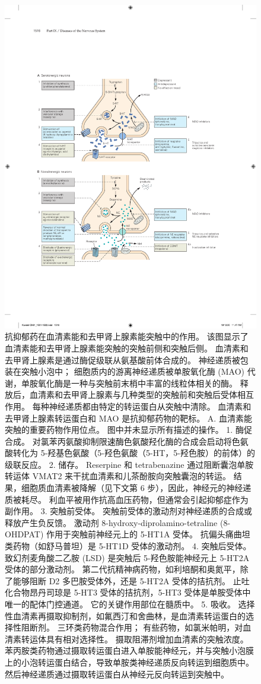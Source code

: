 \begin{figure}[htbp]
	\centering
	\includegraphics[width=0.9\linewidth]{chap61/fig_61_7}
	\caption{抗抑郁药在血清素能和去甲肾上腺素能突触中的作用。 该图显示了血清素能和去甲肾上腺素能突触的突触前侧和突触后侧。 血清素和去甲肾上腺素是通过酶促级联从氨基酸前体合成的。 神经递质被包装在突触小泡中； 细胞质内的游离神经递质被单胺氧化酶 (MAO) 代谢，单胺氧化酶是一种与突触前末梢中丰富的线粒体相关的酶。 释放后，血清素和去甲肾上腺素与几种类型的突触前和突触后受体相互作用。 每种神经递质都由特定的转运蛋白从突触中清除。 血清素和去甲肾上腺素转运蛋白和 MAO 是抗抑郁药物的靶标。 A. 血清素能突触的重要药物作用位点。 图中并未显示所有描述的操作。 1. 酶促合成。 对氯苯丙氨酸抑制限速酶色氨酸羟化酶的合成会启动将色氨酸转化为 5-羟基色氨酸（5-羟色氨酸（5-HT，5-羟色胺）的前体）的级联反应。 2. 储存。 Reserpine 和 tetrabenazine 通过阻断囊泡单胺转运体 VMAT2 来干扰血清素和儿茶酚胺向突触囊泡的转运。 结果，细胞质血清素被降解（见下文第 6 步），因此，神经元的神经递质被耗尽。 利血平被用作抗高血压药物，但通常会引起抑郁症作为副作用。 3. 突触前受体。 突触前受体的激动剂对神经递质的合成或释放产生负反馈。 激动剂 8-hydroxy-diprolamino-tetraline (8-OHDPAT) 作用于突触前神经元上的 5-HT1A 受体。 抗偏头痛曲坦类药物（如舒马普坦）是 5-HT1D 受体的激动剂。 4. 突触后受体。 致幻剂麦角酸二乙胺 (LSD) 是突触后 5-羟色胺能神经元上 5-HT2A 受体的部分激动剂。 第二代抗精神病药物，如利培酮和奥氮平，除了能够阻断 D2 多巴胺受体外，还是 5-HT2A 受体的拮抗剂。 止吐化合物昂丹司琼是 5-HT3 受体的拮抗剂，5-HT3 受体是单胺受体中唯一的配体门控通道。 它的关键作用部位在髓质中。 5. 吸收。 选择性血清素再摄取抑制剂，如氟西汀和舍曲林，是血清素转运蛋白的选择性阻断剂。 三环类药物混合作用； 有些药物，如氯米帕明，对血清素转运体具有相对选择性。 摄取阻滞剂增加血清素的突触浓度。 苯丙胺类药物通过摄取转运蛋白进入单胺能神经元，并与突触小泡膜上的小泡转运蛋白结合，导致单胺类神经递质反向转运到细胞质中。 然后神经递质通过摄取转运蛋白从神经元反向转运到突触中。
}
\end{figure}
